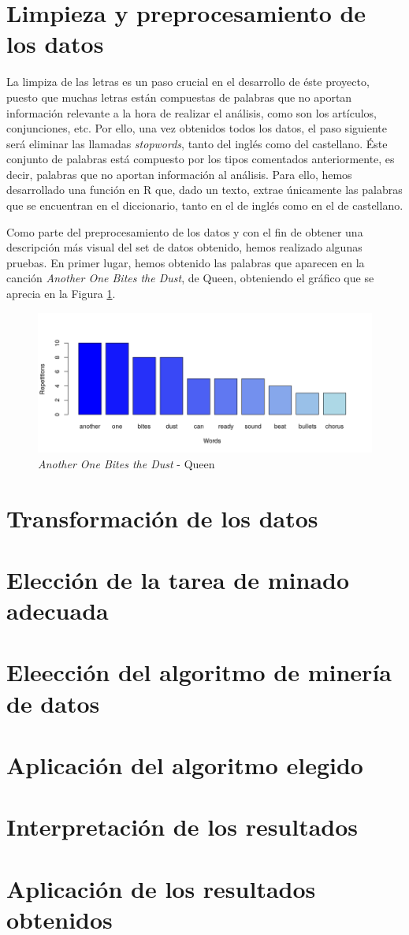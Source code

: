 \section{Limpieza y preprocesamiento de los datos}
La limpiza de las letras es un paso crucial en el desarrollo de éste proyecto, puesto que muchas letras están compuestas de palabras que no aportan información relevante a la hora de realizar el análisis, como son los artículos, conjunciones, etc. Por ello, una vez obtenidos todos los datos, el paso siguiente será eliminar las llamadas \textit{stopwords}, tanto del inglés como del castellano. Éste conjunto de palabras está compuesto por los tipos comentados anteriormente, es decir, palabras que no aportan información al análisis. Para ello, hemos desarrollado una función en R que, dado un texto, extrae únicamente las palabras que se encuentran en el diccionario, tanto en el de inglés como en el de castellano.

Como parte del preprocesamiento de los datos y con el fin de obtener una descripción más visual del set de datos obtenido, hemos realizado algunas pruebas. En primer lugar, hemos obtenido las palabras que aparecen en la canción \textit{Another One Bites the Dust}, de Queen, obteniendo el gráfico que se aprecia en la Figura \ref{fig:queen}.
\begin{figure}
	\centering
	\includegraphics[width=0.7\linewidth]{Imagenes/AnotherOneBitesTheDust}
	\caption{\textit{Another One Bites the Dust} - Queen}
	\label{fig:queen}
\end{figure}


\section{Transformación de los datos}
\section{Elección de la tarea de minado adecuada}
\section{Eleección del algoritmo de minería de datos}
\section{Aplicación del algoritmo elegido}
\section{Interpretación de los resultados}
\section{Aplicación de los resultados obtenidos}